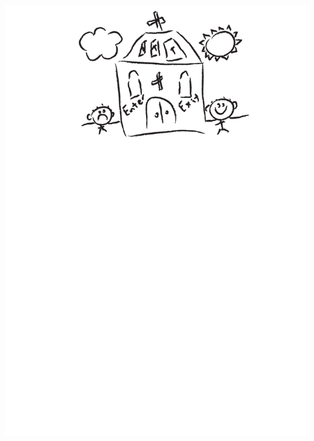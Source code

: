 \documentclass[aps, rmp, twocolumn, amsmath, amssymb, nofootinbib, superscriptaddress, longbibliography, floatfix, table-of-contents, eqsecnum]{revtex4-1}
\begin{document}
\begin{center}
	\includegraphics[width=\linewidth]{sketch_final}
\end{center}
\end{document}
